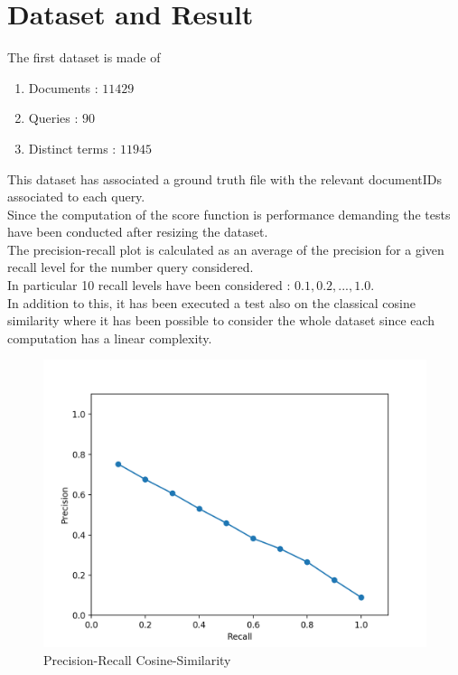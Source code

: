\documentclass[twoside]{article}
\begin{document}
\section{Dataset and Result}
The first dataset is made of
\begin{enumerate}
\item Documents : $11429$
\item Queries : $90$
\item Distinct terms : $11945$
\end{enumerate}
This dataset has associated a ground truth file with the relevant documentIDs associated to each query.\\Since the computation of the score function is performance demanding the tests have been conducted after resizing the dataset.\\The precision-recall plot is calculated as an average of the precision for a given recall level for the number  query considered.\\In particular 10 recall levels have been considered : $ 0.1, 0.2, ... , 1.0 $.\\In addition to this, it has been executed a test also on the classical cosine similarity where it has been possible to consider the whole dataset since each computation has a linear complexity.
\begin{figure}[H]
\centering
        \includegraphics[totalheight=8cm]{cs.png}
    \caption{Precision-Recall Cosine-Similarity}
    \label{fig:plot1}
\end{figure}

%
%
\end{document}
